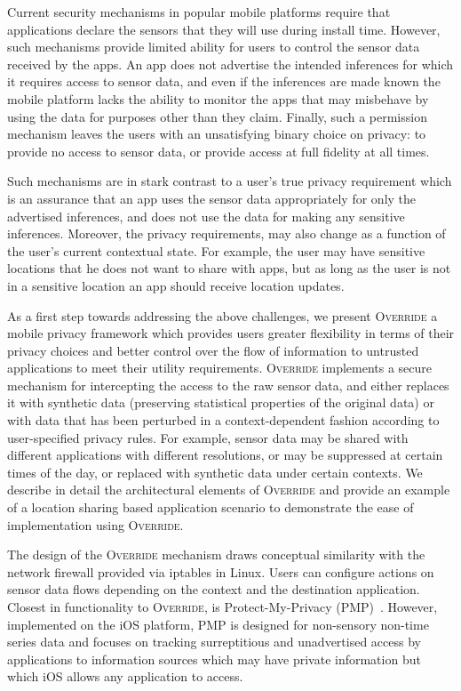 \documentclass[10pt]{sensys-proc}
\begin{document}
Current security mechanisms in popular mobile platforms require that applications declare the sensors that they will use during install time. However, such mechanisms provide limited ability for users to control the sensor data received by the apps. An app does not advertise the intended inferences for which it requires access to sensor data, and even if the inferences are made known the mobile platform lacks the ability to monitor the apps that may misbehave by using the data for purposes other than they claim. Finally, such a permission mechanism leaves the users with an unsatisfying binary choice on privacy: to provide no access to sensor data, or provide access at full fidelity at all times.

Such mechanisms are in stark contrast to a user's true privacy requirement which is an assurance that an app uses the sensor data appropriately for only the advertised inferences, and does not use the data for making any sensitive inferences. Moreover, the privacy requirements, may also change as a function of the user's current contextual state. For example, the user may have sensitive locations that he does not want to share with apps, but as long as the user is not in a sensitive location an app should receive location updates.

As a first step towards addressing the above challenges, we present \textsc{Override} a mobile privacy framework which provides users greater flexibility in terms of their privacy choices and better control over the flow of information to untrusted applications to meet their utility requirements. \textsc{Override} implements a secure mechanism for intercepting the access to the raw sensor data, and either replaces it with synthetic data (preserving statistical properties of the original data) or with data that has been perturbed in a context-dependent fashion according to user-specified privacy rules. For example, sensor data may be shared with different applications with different resolutions, or may be suppressed at certain times of the day, or replaced with synthetic data under certain contexts. We describe in detail the architectural elements of \textsc{Override} and provide an example of a location sharing based application scenario to demonstrate the ease of implementation using \textsc{Override}.

The design of the \textsc{Override} mechanism draws conceptual similarity with the network firewall provided via iptables in Linux. Users can configure actions on sensor data flows depending on the context and the destination application. Closest in functionality to \textsc{Override}, is Protect-My-Privacy (PMP)~\cite{pmp}. However, implemented on the iOS platform, PMP is designed for non-sensory non-time series data and focuses on tracking surreptitious and unadvertised access by applications to information sources which may have private information but which iOS allows any application to access.
\end{document}
